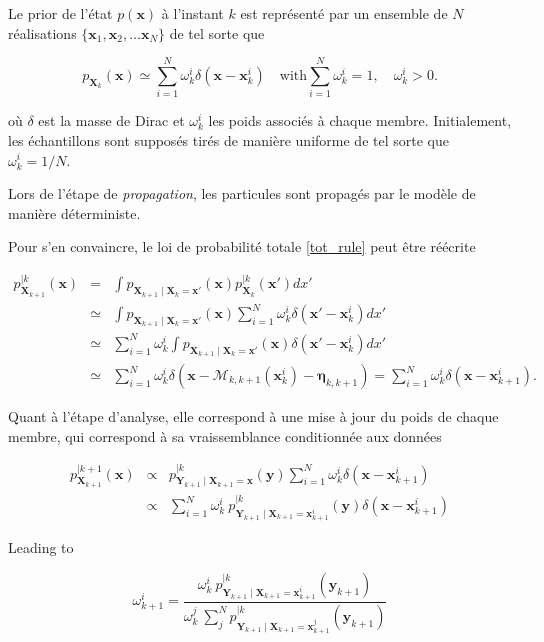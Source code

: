 Le prior de l'état $p(\bm x)$ à l'instant $k$ est représenté par un ensemble de $N$ réalisations $\{\bm x_1, \bm x_2, \dots \bm x_N\}$ de tel sorte que

\begin{equation*}
    p_{\bm X_k}(\bm x) \simeq \sum_{i=1}^N \omega^i_k \delta(\bm x - \bm x_k^i) \quad \text{with} \sum_{i=1}^N \omega^i_k = 1, \quad \omega^i_k > 0.
\end{equation*}

où $\delta$ est la masse de Dirac et $\omega^i_k$ les poids associés à chaque membre. Initialement, les échantillons sont supposés tirés de manière uniforme de tel sorte que $\omega^i_k = 1/N$.

Lors de l'étape de \textit{propagation}, les particules sont propagés par le modèle de manière déterministe.

Pour s'en convaincre, le loi de probabilité totale \ref{tot_rule} peut être réécrite

\begin{eqnarray*}
    p_{\bm X_{k+1}}^{\mid k}(\bm x) &=& \int p_{\bm X_{k+1}\mid \bm X_{k} = \bm x'}(\bm x) p_{\bm X_{k}}^{\mid k}(\bm x')dx' \\
    &\simeq& \int p_{\bm X_{k+1}\mid \bm X_{k} = \bm x'}(\bm x) \sum_{i=1}^N \omega^i_k \delta(\bm x' - \bm x_k^i) dx' \\
    &\simeq& \sum_{i=1}^N \omega^i_k  \int p_{\bm X_{k+1}\mid \bm X_{k} = \bm x'}(\bm x) \delta(\bm x' - \bm x_k^i) dx' \\
    &\simeq& \sum_{i=1}^N \omega^i_k \delta(\bm x - \mathcal M_{k,k+1}(\bm x_k^i) - \bm \eta_{k,k+1}) = \sum_{i=1}^N \omega^i_k \delta(\bm x - \bm x_{k+1}^i).
\end{eqnarray*}

Quant à l'étape d'analyse, elle correspond à une mise à jour du poids de chaque membre, qui correspond à sa vraissemblance conditionnée aux données

\begin{eqnarray*}
    p_{\bm X_{k+1}}^{\mid k+1}(\bm x) &\propto& p_{\bm Y_{k+1} \mid \bm X_{k+1} = \bm x}^{\mid k}(\bm y)  \sum_{i=1}^N \omega^i_k \delta(\bm x - \bm x_{k+1}^i) \\
    &\propto& \sum_{i=1}^N  \omega^i_k~p_{\bm Y_{k+1} \mid \bm X_{k+1} = \bm x_{k+1}^i}^{\mid k}(\bm y)\delta(\bm x - \bm x_{k+1}^i)
\end{eqnarray*}

Leading to

\begin{equation*}
    \omega^i_{k+1}  = \frac{\omega^i_k~p_{\bm Y_{k+1} \mid \bm X_{k+1} = \bm x_{k+1}^i}^{\mid k}(\bm y_{k+1}) }{\omega^j_k~\sum_j^N p_{\bm Y_{k+1} \mid \bm X_{k+1} = \bm x_{k+1}^j}^{\mid k}(\bm y_{k+1}) }
\end{equation*}

